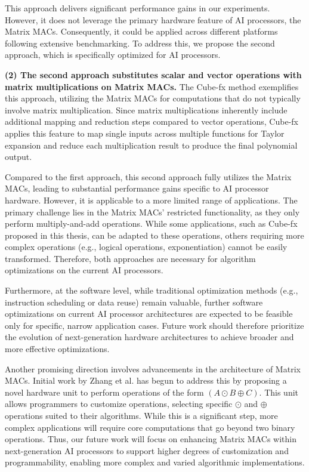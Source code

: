 This approach delivers significant performance gains in our experiments. However, it does not leverage the primary hardware feature of AI processors, the Matrix MACs. Consequently, it could be applied across different platforms following extensive benchmarking. To address this, we propose the second approach, which is specifically optimized for AI processors.

\textbf{(2) The second approach substitutes scalar and vector operations with matrix multiplications on Matrix MACs.}
The Cube-fx method exemplifies this approach, utilizing the Matrix MACs for computations that do not typically involve matrix multiplication. Since matrix multiplications inherently include additional mapping and reduction steps compared to vector operations, Cube-fx applies this feature to map single inputs across multiple functions for Taylor expansion and reduce each multiplication result to produce the final polynomial output.

Compared to the first approach, this second approach fully utilizes the Matrix MACs, leading to substantial performance gains specific to AI processor hardware. However, it is applicable to a more limited range of applications. The primary challenge lies in the Matrix MACs' restricted functionality, as they only perform multiply-and-add operations. While some applications, such as Cube-fx proposed in this thesis, can be adapted to these operations, others requiring more complex operations (e.g., logical operations, exponentiation) cannot be easily transformed. Therefore, both approaches are necessary for algorithm optimizations on the current AI processors. 

Furthermore, at the software level, while traditional optimization methods (e.g., instruction scheduling or data reuse) remain valuable, further software optimizations on current AI processor architectures are expected to be feasible only for specific, narrow application cases. Future work should therefore prioritize the evolution of next-generation hardware architectures to achieve broader and more effective optimizations.

Another promising direction involves advancements in the architecture of Matrix MACs. Initial work by Zhang et al. \cite{10.1145/3470496.3527411} has begun to address this by proposing a novel hardware unit to perform operations of the form $(A \odot B \oplus C)$. This unit allows programmers to customize operations, selecting specific $\odot$ and $\oplus$ operations suited to their algorithms. While this is a significant step, more complex applications will require core computations that go beyond two binary operations. Thus, our future work will focus on enhancing Matrix MACs within next-generation AI processors to support higher degrees of customization and programmability, enabling more complex and varied algorithmic implementations.

